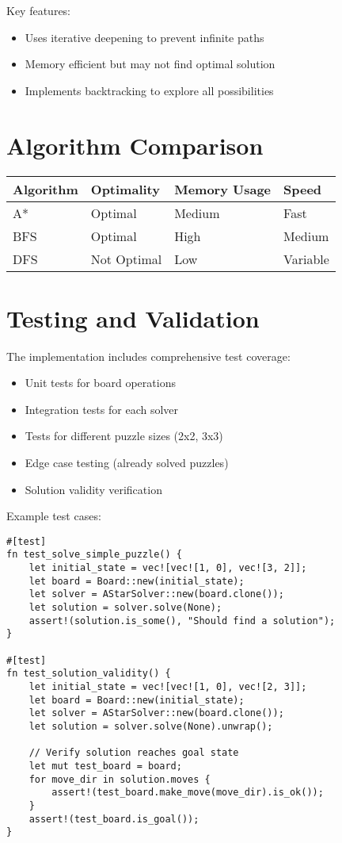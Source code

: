 \documentclass[a4paper]{article}
\begin{document}
Key features:
\begin{itemize}
    \item Uses iterative deepening to prevent infinite paths
    \item Memory efficient but may not find optimal solution
    \item Implements backtracking to explore all possibilities
\end{itemize}

\section{Algorithm Comparison}

\begin{tabular}{|l|l|l|l|}
\hline
\textbf{Algorithm} & \textbf{Optimality} & \textbf{Memory Usage} & \textbf{Speed} \\
\hline
A* & Optimal & Medium & Fast \\
BFS & Optimal & High & Medium \\
DFS & Not Optimal & Low & Variable \\
\hline
\end{tabular}

\section{Testing and Validation}
The implementation includes comprehensive test coverage:
\begin{itemize}
    \item Unit tests for board operations
    \item Integration tests for each solver
    \item Tests for different puzzle sizes (2x2, 3x3)
    \item Edge case testing (already solved puzzles)
    \item Solution validity verification
\end{itemize}

Example test cases:
\begin{lstlisting}[style=rustcode]
#[test]
fn test_solve_simple_puzzle() {
    let initial_state = vec![vec![1, 0], vec![3, 2]];
    let board = Board::new(initial_state);
    let solver = AStarSolver::new(board.clone());
    let solution = solver.solve(None);
    assert!(solution.is_some(), "Should find a solution");
}

#[test]
fn test_solution_validity() {
    let initial_state = vec![vec![1, 0], vec![2, 3]];
    let board = Board::new(initial_state);
    let solver = AStarSolver::new(board.clone());
    let solution = solver.solve(None).unwrap();
    
    // Verify solution reaches goal state
    let mut test_board = board;
    for move_dir in solution.moves {
        assert!(test_board.make_move(move_dir).is_ok());
    }
    assert!(test_board.is_goal());
}
\end{lstlisting}
\end{document}
